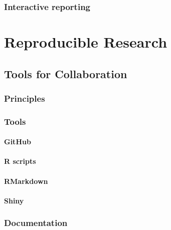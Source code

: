 \documentclass[
]{book}
\begin{document}
\hypertarget{interactive-reporting}{%
\section{Interactive reporting}\label{interactive-reporting}}

\hypertarget{part-reproducible-research}{%
\part*{Reproducible Research}\label{part-reproducible-research}}

\hypertarget{tools_for_colab}{%
\chapter{Tools for Collaboration}\label{tools_for_colab}}

\hypertarget{principles-1}{%
\section{Principles}\label{principles-1}}

\hypertarget{tools}{%
\section{Tools}\label{tools}}

\hypertarget{github-1}{%
\subsection{GitHub}\label{github-1}}

\hypertarget{r-scripts}{%
\subsection{R scripts}\label{r-scripts}}

\hypertarget{rmarkdown}{%
\subsection{RMarkdown}\label{rmarkdown}}

\hypertarget{shiny}{%
\subsection{Shiny}\label{shiny}}

\hypertarget{documentation}{%
\section{Documentation}\label{documentation}}
\end{document}

